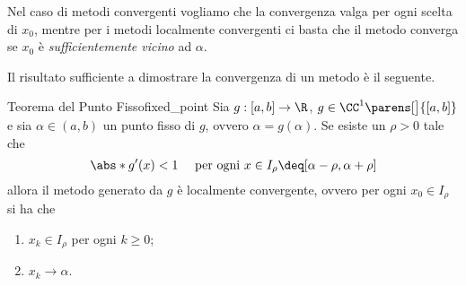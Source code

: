\begin{remark}
    Nel caso di metodi convergenti vogliamo che la convergenza valga per ogni scelta di $x_0$, mentre per i metodi localmente convergenti ci basta che il metodo converga se $x_0$ è \emph{sufficientemente vicino} ad $\alpha$.  
\end{remark}

Il risultato sufficiente a dimostrare la convergenza di un metodo è il seguente.
\begin{theorem}
    {Teorema del Punto Fisso}{fixed_point}
    Sia $g : [a, b] \to \R$, $g \in \CC^1\parens[\big]{[a, b]}$ e sia $\alpha \in (a, b)$ un punto fisso di $g$, ovvero $\alpha = g(\alpha)$. Se esiste un $\rho > 0$ tale che \[
        \abs*{g'(x)} < 1 \quad \text{ per ogni } x \in I_\rho \deq [\alpha - \rho, \alpha + \rho]
    \] allora il metodo generato da $g$ è localmente convergente, ovvero per ogni $x_0 \in I_\rho$ si ha che \begin{enumerate}
        \item $x_k \in I_\rho$ per ogni $k \geq 0$;
        \item $x_k \to \alpha$.  
    \end{enumerate}
\end{theorem}
